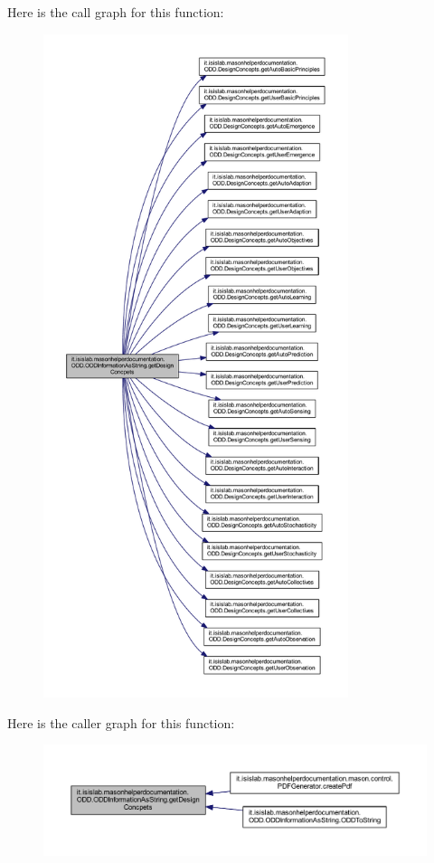 Here is the call graph for this function\-:\nopagebreak
\begin{figure}[H]
\begin{center}
\leavevmode
\includegraphics[height=550pt]{classit_1_1isislab_1_1masonhelperdocumentation_1_1_o_d_d_1_1_o_d_d_information_as_string_ab296e80354c57e17b9e04f91476f3bb9_cgraph}
\end{center}
\end{figure}




Here is the caller graph for this function\-:\nopagebreak
\begin{figure}[H]
\begin{center}
\leavevmode
\includegraphics[width=350pt]{classit_1_1isislab_1_1masonhelperdocumentation_1_1_o_d_d_1_1_o_d_d_information_as_string_ab296e80354c57e17b9e04f91476f3bb9_icgraph}
\end{center}
\end{figure}


